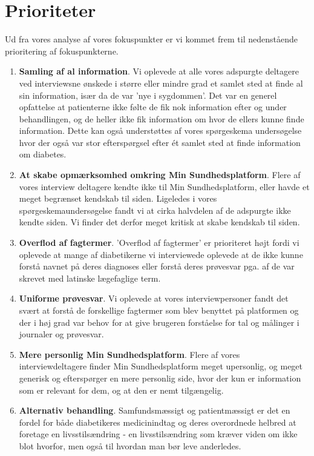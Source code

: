 \section{Prioriteter}
Ud fra vores analyse af vores fokuspunkter er vi kommet frem til nedenstående prioritering af fokuspunkterne.\\
\begin{enumerate}
	\item \textbf{Samling af al information}. Vi oplevede at alle vores adspurgte deltagere ved interviewsne ønskede i større eller mindre grad et samlet sted at finde al sin information, især da de var 'nye i sygdommen'. Det var en generel opfattelse at patienterne ikke følte de fik nok information efter og under behandlingen, og de heller ikke fik information om hvor de ellers kunne finde information. Dette kan også understøttes af vores spørgeskema undersøgelse hvor der også var stor efterspørgsel efter ét samlet sted at finde information om diabetes.
	\item \textbf{At skabe opmærksomhed omkring Min Sundhedsplatform}. Flere af vores interview deltagere kendte ikke til Min Sundhedsplatform, eller havde et meget begrænset kendskab til siden. Ligeledes i vores spørgeskemaundersøgelse fandt vi at cirka halvdelen af de adspurgte ikke kendte siden. Vi finder det derfor meget kritisk at skabe kendskab til siden.
	\item \textbf{Overflod af fagtermer}. 'Overflod af fagtermer' er prioriteret højt fordi vi oplevede at mange af diabetikerne vi interviewede oplevede at de ikke kunne forstå navnet på deres diagnoses eller forstå deres prøvesvar pga. af de var skrevet med latinske lægefaglige term.
	\item \textbf{Uniforme prøvesvar}. Vi oplevede at vores interviewpersoner fandt det svært at forstå de forskellige fagtermer som blev benyttet på platformen og der i høj grad var behov for at give brugeren forståelse for tal og målinger i journaler og prøvesvar.
	\item \textbf{Mere personlig Min Sundhedsplatform}. Flere af vores interviewdeltagere finder Min Sundhedsplatform meget upersonlig, og meget generisk og efterspørger en mere personlig side, hvor der kun er information som er relevant for dem, og at den er nemt tilgængelig.
	\item \textbf{Alternativ behandling}. Samfundsmæssigt og patientmæssigt er det en fordel for både diabetikeres medicinindtag og deres overordnede helbred at foretage en livsstilsændring - en livsstilsændring som kræver viden om ikke blot hvorfor, men også til hvordan man bør leve anderledes.

\end{enumerate}
